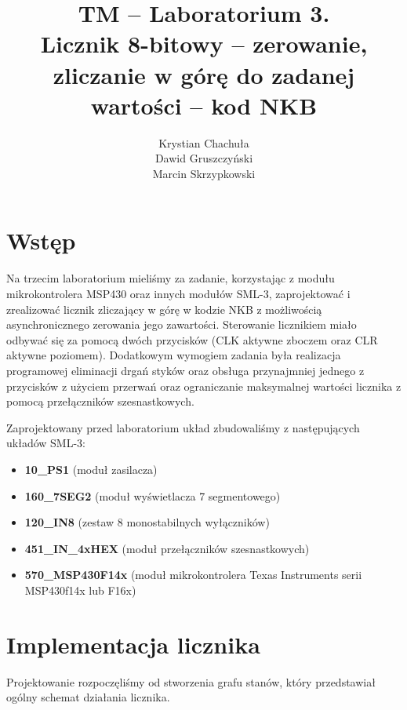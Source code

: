 \documentclass[fleqn]{article}
\title{TM -- Laboratorium 3. \\ \large Licznik 8-bitowy – zerowanie, zliczanie w górę do zadanej wartości – kod NKB}
\author{Krystian Chachuła \\ Dawid Gruszczyński \\ Marcin Skrzypkowski}
\begin{document}
\maketitle

\setcounter{page}{0}
\thispagestyle{empty}

\pagebreak

\setcounter{page}{1}

\section{Wstęp}

Na trzecim laboratorium mieliśmy za zadanie, korzystając z modułu mikrokontrolera MSP430 oraz innych modułów SML-3, zaprojektować i zrealizować licznik zliczający w górę w kodzie NKB z możliwością asynchronicznego zerowania jego zawartości.
Sterowanie licznikiem miało odbywać się za pomocą dwóch przycisków (CLK aktywne zboczem oraz CLR aktywne poziomem).
Dodatkowym wymogiem zadania była realizacja programowej eliminacji drgań styków oraz obsługa przynajmniej jednego z przycisków z użyciem przerwań oraz ograniczanie maksymalnej wartości licznika z pomocą przełączników szesnastkowych.

Zaprojektowany przed laboratorium układ zbudowaliśmy z następujących układów SML-3:

\begin{itemize}
	\item \textbf{10\_PS1} (moduł zasilacza)
	\item \textbf{160\_7SEG2} (moduł wyświetlacza 7 segmentowego)
	\item \textbf{120\_IN8} (zestaw 8 monostabilnych wyłączników)
	\item \textbf{451\_IN\_4xHEX} (moduł przełączników szesnastkowych)
	\item \textbf{570\_MSP430F14x} (moduł mikrokontrolera Texas Instruments serii MSP430f14x lub F16x)
\end{itemize}

\section{Implementacja licznika}

Projektowanie rozpoczęliśmy od stworzenia grafu stanów, który przedstawiał ogólny schemat działania licznika.
\end{document}
